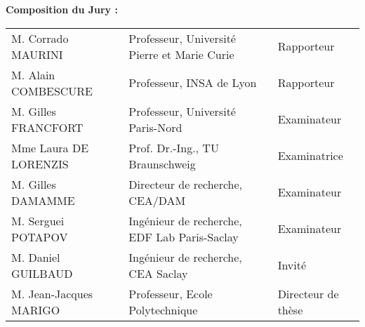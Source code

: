 \begin{titlepage}
\begin{mdframed}
\begin{flushleft}
\textbf{Composition du Jury :}

\vspace{15pt}
\begin{tabular}{@{}lll}
M. Corrado MAURINI & Professeur, Université Pierre et Marie Curie & Rapporteur \\
M. Alain COMBESCURE & Professeur, INSA de Lyon & Rapporteur \\
M. Gilles FRANCFORT & Professeur, Université Paris-Nord & Examinateur \\
Mme Laura DE LORENZIS & Prof. Dr.-Ing., TU Braunschweig & Examinatrice \\
M. Gilles DAMAMME & Directeur de recherche, CEA/DAM & Examinateur \\
M. Serguei POTAPOV & Ingénieur de recherche, EDF Lab Paris-Saclay & Examinateur \\
M. Daniel GUILBAUD & Ingénieur de recherche, CEA Saclay & Invité \\
M. Jean-Jacques MARIGO & Professeur, Ecole Polytechnique & Directeur de thèse
\end{tabular}
\end{flushleft}
\end{mdframed}
\end{titlepage}

\titlepage
\setcounter{page}{3}
\restoregeometry